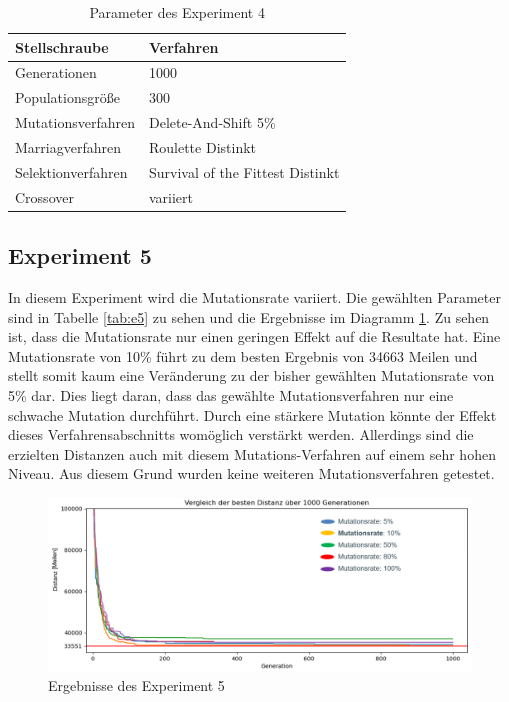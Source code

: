 \begin{table}[H]
\centering
\caption{Parameter des Experiment 4}
\begin{tabular}{ll}
Stellschraube & Verfahren \\
\hline
Generationen & 1000 \\
Populationsgröße & 300 \\
Mutationsverfahren & Delete-And-Shift 5\% \\
Marriagverfahren & Roulette Distinkt \\
Selektionverfahren & Survival of the Fittest Distinkt \\
Crossover & variiert
\end{tabular}
\label{tab:e4}
\end{table}

\subsection{Experiment 5}
In diesem Experiment wird die Mutationsrate variiert. Die gewählten Parameter sind in Tabelle \ref{tab:e5} zu sehen und die Ergebnisse im Diagramm \ref{fig:experiment5}. Zu sehen ist, dass die Mutationsrate nur einen geringen Effekt auf die Resultate hat. 
Eine Mutationsrate von 10\% führt zu dem besten Ergebnis von 34663 Meilen und stellt somit kaum eine Veränderung zu der bisher gewählten Mutationsrate von 5\% dar. Dies liegt daran, dass das gewählte Mutationsverfahren nur eine schwache Mutation durchführt. Durch eine stärkere Mutation könnte der Effekt dieses Verfahrensabschnitts womöglich verstärkt werden. Allerdings sind die erzielten Distanzen auch mit diesem Mutations-Verfahren auf einem sehr hohen Niveau. Aus diesem Grund wurden keine weiteren Mutationsverfahren getestet.

\begin{figure}[H]
\centering
\includegraphics[width=1\textwidth]{img/Vortrag/experiment5.png}
\caption{Ergebnisse des Experiment 5}
\label{fig:experiment5}
\end{figure}

